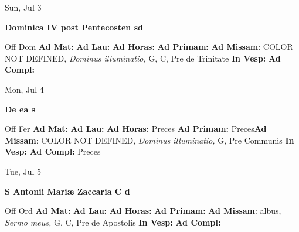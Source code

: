 \documentclass[10pt]{memoir}
\begin{document}
\begin{center}
\begin{minipage}{3.5in}
\vspace{2em}
\begin{center}Sun, Jul 3
\end{center}
\textbf{ \large Dominica IV post Pentecosten
\textnormal{\normalsize sd}}

\begin{justify}Off Dom
\textbf{Ad Mat: }
\textbf{Ad Lau: }
\textbf{Ad Horas: }
\textbf{Ad Primam: }\textbf{Ad Missam}: COLOR NOT DEFINED, \textit{Dominus illuminatio,} G, C, Pre de Trinitate
\textbf{In Vesp: }
\textbf{Ad Compl: }
\end{justify}
\end{minipage}
\end{center}

\begin{center}
\begin{minipage}{3.5in}
\vspace{2em}
\begin{center}Mon, Jul 4
\end{center}
\textbf{ \large De ea
\textnormal{\normalsize s}}

\begin{justify}Off Fer
\textbf{Ad Mat: }
\textbf{Ad Lau: }
\textbf{Ad Horas: }Preces
\textbf{Ad Primam: }Preces\textbf{Ad Missam}: COLOR NOT DEFINED, \textit{Dominus illuminatio,} G, Pre Communis
\textbf{In Vesp: }
\textbf{Ad Compl: }Preces
\end{justify}
\end{minipage}
\end{center}

\begin{center}
\begin{minipage}{3.5in}
\vspace{2em}
\begin{center}Tue, Jul 5
\end{center}
\textbf{ \large S Antonii Mariæ Zaccaria C
\textnormal{\normalsize d}}

\begin{justify}Off Ord
\textbf{Ad Mat: }
\textbf{Ad Lau: }
\textbf{Ad Horas: }
\textbf{Ad Primam: }\textbf{Ad Missam}: albus, \textit{Sermo meus,} G, C, Pre de Apostolis
\textbf{In Vesp: }
\textbf{Ad Compl: }
\end{justify}
\end{minipage}
\end{center}
\end{document}
